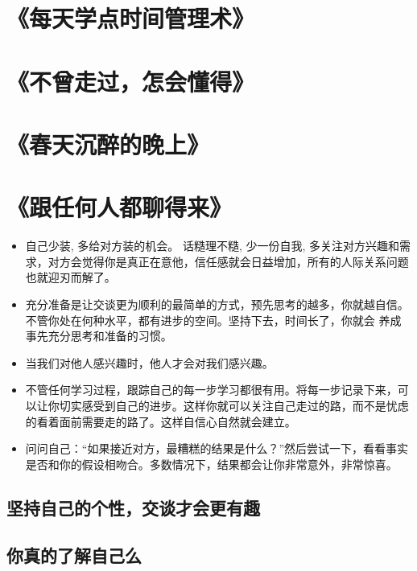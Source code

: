 \documentclass[UTF8,a4paper,8pt]{ctexart}
\begin{document}
 
 \newpage
 \section{《每天学点时间管理术》 }
 
 \newpage
 \section{《不曾走过，怎会懂得》 }
 
 \newpage
 \section{《春天沉醉的晚上》 }
 
 \newpage
 \section{《跟任何人都聊得来》 }
 \begin{itemize}
 	\item 自己少装, 多给对方装的机会。 话糙理不糙, 少一份自我, 多关注对方兴趣和需求，对方会觉得你是真正在意他，信任感就会日益增加，所有的人际关系问题也就迎刃而解了。
 	
 	\item 充分准备是让交谈更为顺利的最简单的方式，预先思考的越多，你就越自信。不管你处在何种水平，都有进步的空间。坚持下去，时间长了，你就会 养成事先充分思考和准备的习惯。
 	
 	\item 当我们对他人感兴趣时，他人才会对我们感兴趣。
 	
 	\item 不管任何学习过程，跟踪自己的每一步学习都很有用。将每一步记录下来，可以让你切实感受到自己的进步。这样你就可以关注自己走过的路，而不是忧虑的看着面前需要走的路了。这样自信心自然就会建立。
 	
 	\item 问问自己：“如果接近对方，最糟糕的结果是什么？”然后尝试一下，看看事实是否和你的假设相吻合。多数情况下，结果都会让你非常意外，非常惊喜。
 \end{itemize}
 
 
	 \subsection{坚持自己的个性，交谈才会更有趣}
	 
	 \subsection{你真的了解自己么}
	 
\end{document}
